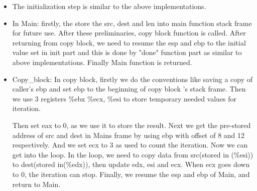 \documentclass{article}
\begin{document}
\begin{itemize}
\begin{itemize}
\item The initialization step is similar to the above implementations.
\item In Main: firstly, the store the src, dest and len into main function stack frame for future use. After these preliminaries, copy block function is called. After returning from copy block, we need to resume the esp and ebp to the initial value set in init part and this is done by "done" function part as similar to above implementations. Finally Main function is returned.
\item Copy\_block: In copy block, firstly we do the conventions like saving a copy of caller’s ebp and set ebp to the beginning of copy block ’s stack frame. Then we use 3 registers \%ebx \%ecx, \%esi to store temporary needed values for iteration. 

Then set eax to 0, as we use it to store the result. Next we get the pre-stored address of src and dest in Mains frame by using ebp with offset of 8 and 12 respectively. And we set ecx to 3 as used to count the iteration. Now we can get into the loop. In the loop, we need to copy data from src(stored in (\%esi)) to dest(stored in(\%edx)), then update edx, esi and ecx. When ecx goes down to 0, the iteration can stop. Finally, we resume the esp and ebp of Main, and return to Main.
\end{itemize}


\end{itemize}
\end{document}
